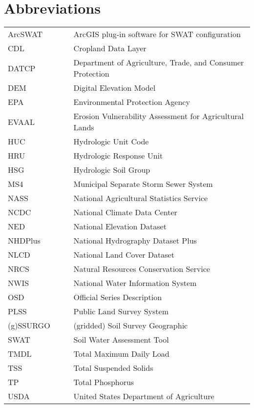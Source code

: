 \section*{Abbreviations}

\begin{tabular}{l c c l}

ArcSWAT &   & & ArcGIS plug-in software for SWAT configuration \\
CDL		&	& &	Cropland Data Layer				\\
DATCP	&	& & Department of Agriculture, Trade, and Consumer Protection \\
DEM		&	& &	Digital Elevation Model			\\
EPA		&	& &	Environmental Protection Agency	\\
EVAAL	&	& & Erosion Vulnerability Assessment for Agricultural Lands \\
HUC		&	& & Hydrologic Unit Code 			\\
HRU 	& 	& &	Hydrologic Response Unit 		\\
HSG		&	& &	Hydrologic Soil Group			\\
MS4		&	& &	Municipal Separate Storm Sewer System \\
NASS	&	& &	National Agricultural Statistics Service \\
NCDC	&	& &	National Climate Data Center \\
NED     &   & & National Elevation Dataset \\
NHDPlus &   & & National Hydrography Dataset Plus \\
NLCD	&	& &	National Land Cover Dataset	\\
NRCS	& 	& &	Natural Resources Conservation Service \\
NWIS	&	& &	National Water Information System \\
OSD		&	& &	Official Series Description \\
PLSS    &   & & Public Land Survey System \\
(g)SSURGO	& & &	(gridded) Soil Survey Geographic \\
SWAT 	& 	& &	Soil Water Assessment Tool 		\\
TMDL	&	& &	Total Maximum Daily Load		\\
TSS		&	& &	Total Suspended Solids		\\
TP		&	& & Total Phosphorus			\\
USDA	&	& &	United States Department of Agriculture\\

\end{tabular}
